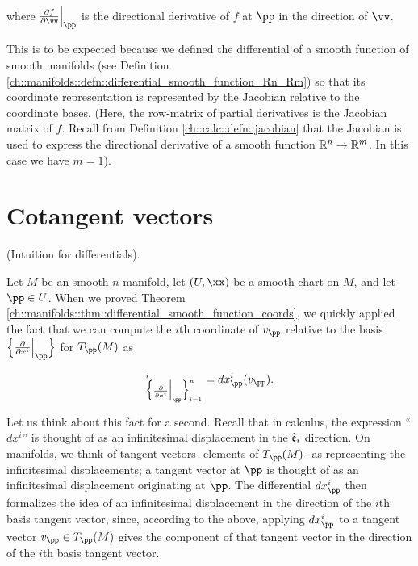 \begin{remark}
    where $\frac{\pd f}{\pd \vv}\Big|_\pp$ is the directional derivative of $f$ at $\pp$ in the direction of $\vv$. 
    
    This is to be expected because we defined the differential of a smooth function of smooth manifolds (see Definition \ref{ch::manifolds::defn::differential_smooth_function_Rn_Rm}) so that its coordinate representation is represented by the Jacobian relative to the coordinate bases. (Here, the row-matrix of partial derivatives is the Jacobian matrix of $f$. Recall from Definition \ref{ch::calc::defn::jacobian} that the Jacobian is used to express the directional derivative of a smooth function $\mathbb{R}^n \rightarrow \mathbb{R}^m$. In this case we have $m = 1$).
\end{remark}

\newpage 

\section{Cotangent vectors}
\label{ch::manifolds::tangent_cotangent_with_coords}

\begin{remark}
    (Intuition for differentials).

    Let $M$ be an smooth $n$-manifold, let $(U, \xx)$ be a smooth chart on $M$, and let $\pp \in U$. When we proved Theorem \ref{ch::manifolds::thm::differential_smooth_function_coords}, we quickly applied the fact that we can compute the $i$th coordinate of $v_\pp$ relative to the basis $\Big\{ \frac{\pd}{\pd x^i}\Big|_\pp \Big\}$ for $T_\pp(M)$ as 

    \begin{align*}
        [v_\pp]_{\Big\{ \frac{\pd}{\pd x^i}\Big|_\pp \Big\}_{i = 1}^n}^i = dx^i_\pp(v_\pp).
    \end{align*}

    Let us think about this fact for a second. Recall that in calculus, the expression ``$dx^i$'' is thought of as an infinitesimal displacement in the $\hat{\mathfrak{e}}_i$ direction. On manifolds, we think of tangent vectors- elements of $T_\pp(M)$- as representing the infinitesimal displacements; a tangent vector at $\pp$ is thought of as an infinitesimal displacement originating at $\pp$. The differential $dx^i_\pp$ then formalizes the idea of an infinitesimal displacement in the direction of the $i$th basis tangent vector, since, according to the above, applying $dx^i_\pp$ to a tangent vector $v_\pp \in T_\pp(M)$ gives the component of that tangent vector in the direction of the $i$th basis tangent vector.
\end{remark}

